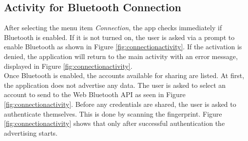 
\subsection{Activity for Bluetooth Connection}
After selecting the menu item \textit{Connection}, the app checks immediately if Bluetooth is enabled. If it is not turned on, the user is asked via a prompt to enable Bluetooth as shown in Figure \ref{fig:connectionactivity}\protect{}.
If the activation is denied, the application will return to the main activity with an error message, displayed in Figure \ref{fig:connectionactivity}\protect{}. \\
Once Bluetooth is enabled, the accounts available for sharing are listed. At first, the application does not advertise any data. The user is asked to select an account to send to the Web Bluetooth API as seen in Figure \ref{fig:connectionactivity}\protect{}. Before any credentials are shared, the user is asked to authenticate themselves. This is done by scanning the fingerprint. Figure \ref{fig:connectionactivity}\protect{} shows that only after successful authentication the advertising starts.

